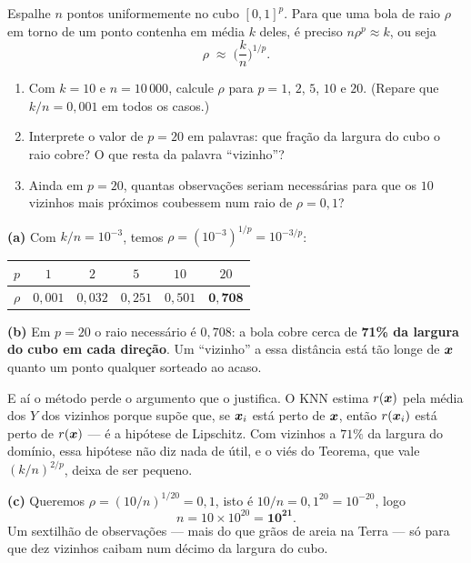 \documentclass[11pt,a4paper]{article}
\begin{document}
\begin{exercicio}
Espalhe $n$ pontos uniformemente no cubo $[0,1]^p$. Para que uma bola de raio
$\rho$ em torno de um ponto contenha em média $k$ deles, é preciso
$n\rho^p\approx k$, ou seja
\[
  \rho \;\approx\; \Big(\frac{k}{n}\Big)^{1/p} .
\]
\begin{enumerate}[label=(\alph*),leftmargin=1.1cm]
  \item Com $k=10$ e $n=10\,000$, calcule $\rho$ para $p=1$, $2$, $5$, $10$ e
        $20$. (Repare que $k/n=0{,}001$ em todos os casos.)
  \item Interprete o valor de $p=20$ em palavras: que fração da largura do cubo
        o raio cobre? O que resta da palavra ``vizinho''?
  \item Ainda em $p=20$, quantas observações seriam necessárias para que os $10$
        vizinhos mais próximos coubessem num raio de $\rho=0{,}1$?
\end{enumerate}
\end{exercicio}

\begin{solucao}
\textbf{(a)} Com $k/n=10^{-3}$, temos $\rho=(10^{-3})^{1/p}=10^{-3/p}$:
\begin{center}\small
\renewcommand{\arraystretch}{1.3}
\begin{tabular}{@{}lccccc@{}}
\toprule
$p$ & $1$ & $2$ & $5$ & $10$ & $20$ \\
\midrule
$\rho$ & $0{,}001$ & $0{,}032$ & $0{,}251$ & $0{,}501$ & $\mathbf{0{,}708}$ \\
\bottomrule
\end{tabular}
\end{center}

\smallskip
\textbf{(b)} Em $p=20$ o raio necessário é $0{,}708$: a bola cobre cerca de
\textbf{71\% da largura do cubo em cada direção}. Um ``vizinho'' a essa distância
está tão longe de $\bm{x}$ quanto um ponto qualquer sorteado ao acaso.

E aí o método perde o argumento que o justifica. O KNN estima $r(\bm{x})$ pela média
dos $Y$ dos vizinhos porque supõe que, se $\bm{x}_i$ está perto de $\bm{x}$, então
$r(\bm{x}_i)$ está perto de $r(\bm{x})$ --- é a hipótese de Lipschitz. Com vizinhos a
$71\%$ da largura do domínio, essa hipótese não diz nada de útil, e o viés do
Teorema, que vale $(k/n)^{2/p}$, deixa de ser pequeno.

\smallskip
\textbf{(c)} Queremos $\rho=(10/n)^{1/20}=0{,}1$, isto é
$10/n=0{,}1^{20}=10^{-20}$, logo
\[
  n = 10\times 10^{20} = \mathbf{10^{21}} .
\]
Um sextilhão de observações --- mais do que grãos de areia na Terra --- só para
que dez vizinhos caibam num décimo da largura do cubo.
\end{solucao}
\end{document}
